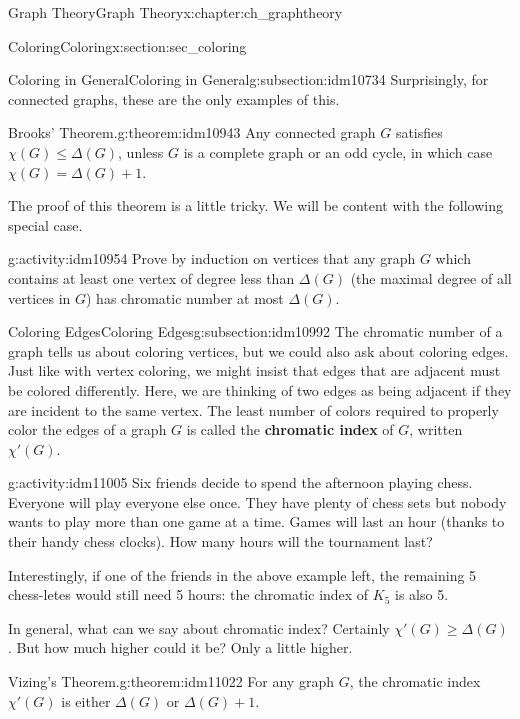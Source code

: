 \documentclass[oneside,10pt,]{book}
\newcommand{\terminology}[1]{\textbf{#1}}
\numberwithin{equation}{chapter}
\begin{document}
\begin{chapterptx}{Graph Theory}{}{Graph Theory}{}{}{x:chapter:ch_graphtheory}
\begin{sectionptx}{Coloring}{}{Coloring}{}{}{x:section:sec_coloring}
\begin{subsectionptx}{Coloring in General}{}{Coloring in General}{}{}{g:subsection:idm10734}
Surprisingly, for connected graphs, these are the only examples of this.%
\begin{theorem}{Brooks' Theorem.}{}{g:theorem:idm10943}%
 Any connected graph \(G\) satisfies \(\chi(G) \le \Delta(G)\), unless \(G\) is a complete graph or an odd cycle, in which case \(\chi(G) = \Delta(G) + 1\).%
\end{theorem}
The proof of this theorem is a little tricky.  We will be content with the following special case.%
\begin{activity}{}{g:activity:idm10954}%
Prove by induction on vertices that any graph \(G\) which contains at least one vertex of degree less than \(\Delta(G)\) (the maximal degree of all vertices in \(G\)) has chromatic number at most \(\Delta(G)\).%
\end{activity}
\end{subsectionptx}
%
%
\typeout{************************************************}
\typeout{************************************************}
%
\begin{subsectionptx}{Coloring Edges}{}{Coloring Edges}{}{}{g:subsection:idm10992}
The chromatic number of a graph tells us about coloring vertices, but we could also ask about coloring edges. Just like with vertex coloring, we might insist that edges that are adjacent must be colored differently. Here, we are thinking of two edges as being adjacent if they are incident to the same vertex. The least number of colors required to properly color the edges of a graph \(G\) is called the \terminology{chromatic index} of \(G\), written \(\chi'(G)\)\label{g:notation:idm11001}.%
\begin{activity}{}{g:activity:idm11005}%
Six friends decide to spend the afternoon playing chess. Everyone will play everyone else once. They have plenty of chess sets but nobody wants to play more than one game at a time. Games will last an hour (thanks to their handy chess clocks). How many hours will the tournament last?%
\end{activity}
Interestingly, if one of the friends in the above example left, the remaining 5 chess-letes would still need 5 hours: the chromatic index of \(K_5\) is also 5.%
\par
In general, what can we say about chromatic index? Certainly \(\chi'(G) \ge \Delta(G)\). But how much higher could it be? Only a little higher.%
\begin{theorem}{Vizing's Theorem.}{}{g:theorem:idm11022}%
 For any graph \(G\), the chromatic index \(\chi'(G)\) is either \(\Delta(G)\) or \(\Delta(G) + 1\).%

\end{theorem}
\end{subsectionptx}
\end{sectionptx}
\end{chapterptx}
\end{document}
